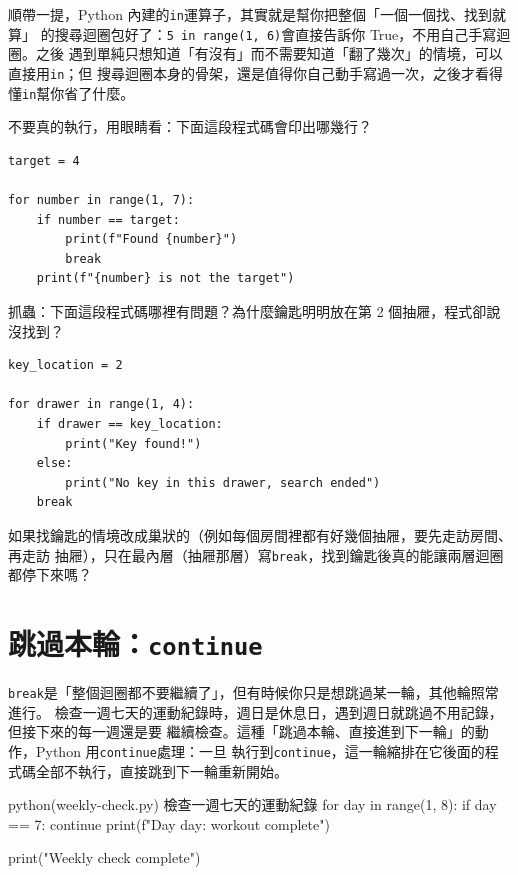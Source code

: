 順帶一提，Python 內建的\texttt{in}運算子，其實就是幫你把整個「一個一個找、找到就算」
的搜尋迴圈包好了：\texttt{5 in range(1, 6)}會直接告訴你 True，不用自己手寫迴圈。之後
遇到單純只想知道「有沒有」而不需要知道「翻了幾次」的情境，可以直接用\texttt{in}；但
搜尋迴圈本身的骨架，還是值得你自己動手寫過一次，之後才看得懂\texttt{in}幫你省了什麼。

\begin{drills}[label=drills:break-search]
\item 不要真的執行，用眼睛看：下面這段程式碼會印出哪幾行？
\begin{verbatim}
target = 4

for number in range(1, 7):
    if number == target:
        print(f"Found {number}")
        break
    print(f"{number} is not the target")
\end{verbatim}
\item 抓蟲：下面這段程式碼哪裡有問題？為什麼鑰匙明明放在第 2 個抽屜，程式卻說沒找到？
\begin{verbatim}
key_location = 2

for drawer in range(1, 4):
    if drawer == key_location:
        print("Key found!")
    else:
        print("No key in this drawer, search ended")
    break
\end{verbatim}
\item 如果找鑰匙的情境改成巢狀的（例如每個房間裡都有好幾個抽屜，要先走訪房間、再走訪
抽屜），只在最內層（抽屜那層）寫\texttt{break}，找到鑰匙後真的能讓兩層迴圈都停下來嗎？
\end{drills}

\section{跳過本輪：\texttt{continue}}
\label{sec:continue}

\texttt{break}是「整個迴圈都不要繼續了」，但有時候你只是想跳過某一輪，其他輪照常進行。
檢查一週七天的運動紀錄時，週日是休息日，遇到週日就跳過不用記錄，但接下來的每一週還是要
繼續檢查。這種「跳過本輪、直接進到下一輪」的動作，Python 用\texttt{continue}處理：一旦
執行到\texttt{continue}，這一輪縮排在它後面的程式碼全部不執行，直接跳到下一輪重新開始。

\begin{example}{python}{(weekly-check.py) 檢查一週七天的運動紀錄}
for day in range(1, 8):
    if day == 7:
        continue
    print(f"Day {day}: workout complete")

print("Weekly check complete")
\end{example}

